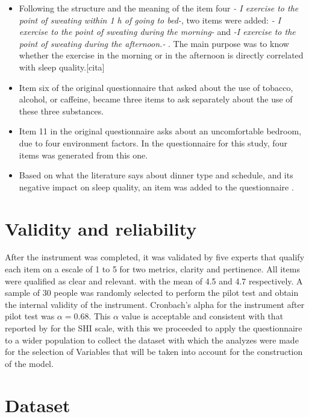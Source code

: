 \documentclass[]{book}
\begin{document}
\begin{itemize}
\item
  Following the structure and the meaning of the item four \emph{- I
  exercise to the point of sweating within 1 h of going to bed-}, two
  items were added: \emph{- I exercise to the point of sweating during
  the morning-} and \emph{-I exercise to the point of sweating during
  the afternoon.- }. The main purpose was to know whether the exercise
  in the morning or in the afternoon is directly correlated with sleep
  quality.{[}cita{]}
\item
  Item six of the original questionnaire that asked about the use of
  tobacco, alcohol, or caffeine, became three items to ask separately
  about the use of these three substances.
\item
  Item 11 in the original questionnaire asks about an uncomfortable
  bedroom, due to four environment factors. In the questionnaire for
  this study, four items was generated from this one.
\item
  Based on what the literature says about dinner type and schedule, and
  its negative impact on sleep quality, an item was added to the
  questionnaire
  \citep[Stefano2014,\citet{Irish2015},\citet{Wentz2011}]{Posner2011}.
\end{itemize}

\section{Validity and reliability}\label{validity-and-reliability}

After the instrument was completed, it was validated by five experts
that qualify each item on a escale of 1 to 5 for two metrics, clarity
and pertinence. All items were qualified as clear and relevant. with the
mean of 4.5 and 4.7 respectively. A sample of 30 people was randomly
selected to perform the pilot test and obtain the internal validity of
the instrument. Cronbach's alpha for the instrument after pilot test was
\(\alpha=0.68\). This \(\alpha\) value is acceptable and consistent with
that reported by \citep{mastin2006} for the SHI scale, with this we
proceeded to apply the questionnaire to a wider population to collect
the dataset with which the analyzes were made for the selection of
Variables that will be taken into account for the construction of the
model.

\section{Dataset}\label{dataset}
\end{document}
